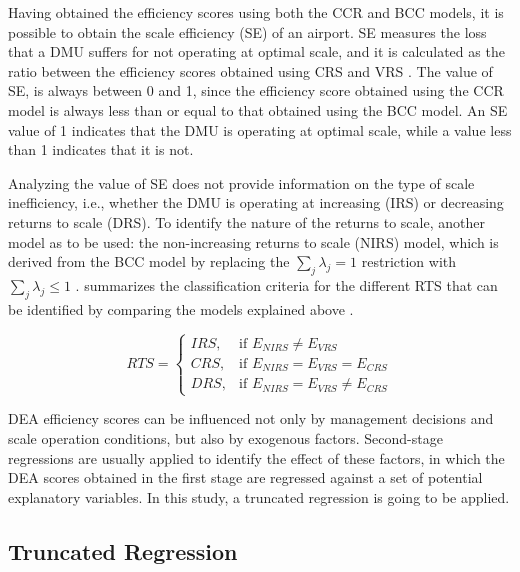 Having obtained the efficiency scores using both the CCR and BCC models,
it is possible to obtain the scale efficiency (SE) of an airport. SE measures the loss that a DMU suffers
for not operating at optimal scale, and it is calculated as the ratio between the efficiency scores obtained
using CRS and VRS \cite{bogetoft2011}.
The value of SE, is always between 0 and 1, since the efficiency score obtained using the CCR model is always less than or equal to that obtained using the BCC model. An SE value of 1 indicates that the DMU is operating at optimal scale, while a value less than 1 indicates that it is not.

Analyzing the value of SE does not provide information on the type of scale inefficiency, i.e., whether
the DMU is operating at increasing (IRS) or decreasing returns to scale (DRS). To identify the nature of the returns to
scale, another model as to be used: the non-increasing returns to scale (NIRS) model, which is derived
from the BCC model by replacing the \(\sum_j \lambda_j = 1\) restriction with \(\sum_j \lambda_j \leq 1\) \cite{coelli2005}.  summarizes the classification criteria for the different RTS that can be identified
by comparing the models explained above \cite{huguenin2012}.
\vspace{-0.5cm}

\begin{equation}
\label{eq:rts_definition}
RTS =
\begin{cases}
IRS, & \text{if } E_{NIRS} \neq E_{VRS} \\
CRS, & \text{if } E_{NIRS} = E_{VRS} = E_{CRS} \\
DRS, & \text{if } E_{NIRS} = E_{VRS} \neq E_{CRS}
\end{cases}
\end{equation}
 \vspace{-0.3cm}

DEA efficiency scores can be influenced not only by management decisions and scale
operation conditions, but also by exogenous factors. Second-stage regressions are usually
applied to identify the effect of these factors, in which the DEA scores obtained in the first
stage are regressed against a set of potential explanatory variables. In this study, a truncated regression
is going to be applied.

\subsection{Truncated Regression} 
\label{truncreg}

